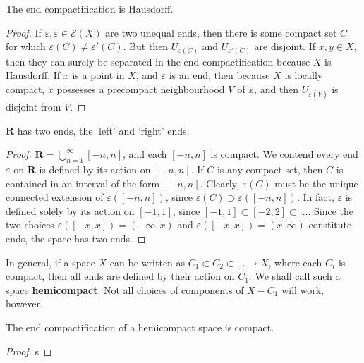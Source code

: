 \begin{lemma}
    The end compactification is Hausdorff.
\end{lemma}
\begin{proof}
    If $\varepsilon, \varepsilon \in \mathcal{E}(X)$ are two unequal ends, then there is some compact set $C$ for which $\varepsilon(C) \neq \varepsilon'(C)$. But then $U_{\varepsilon(C)}$ and $U_{\varepsilon'(C)}$ are disjoint. If $x, y \in X$, then they can surely be separated in the end compactification because $X$ is Hausdorff. If $x$ is a point in $X$, and $\varepsilon$ is an end, then because $X$ is locally compact, $x$ possesses a precompact neighbourhood $V$ of $x$, and then $U_{\varepsilon(\overline{V})}$ is disjoint from $V$.
\end{proof}

\begin{lemma}
    $\mathbf{R}$ has two ends, the `left' and `right' ends.
\end{lemma}
\begin{proof}
    $\mathbf{R} = \bigcup_{n = 1}^\infty [-n, n]$, and each $[-n, n]$ is compact. We contend every end $\varepsilon$ on $\mathbf{R}$ is defined by its action on $[-n, n]$. If $C$ is any compact set, then $C$ is contained in an interval of the form $[-n, n]$. Clearly, $\varepsilon(C)$ must be the unique connected extension of $\varepsilon([-n, n])$, since $\varepsilon(C) \supset \varepsilon([-n,n])$. In fact, $\varepsilon$ is defined solely by its action on $[-1,1]$, since $[-1,1] \subset [-2,2] \subset \dots$. Since the two choices $\varepsilon([-x,x]) = (-\infty, x)$ and $\varepsilon([-x,x]) = (x,\infty)$ constitute ends, the space has two ends.
\end{proof}

In general, if a space $X$ can be written as $C_1 \subset C_2 \subset \dots \to X$, where each $C_i$ is compact, then all ends are defined by their action on $C_1$. We shall call such a space {\bf hemicompact}. Not all choices of components of $X - C_1$ will work, however.

\begin{lemma}
    The end compactification of a hemicompact space is compact.
\end{lemma}
\begin{proof}
    s
\end{proof}

